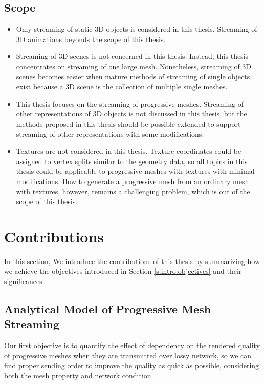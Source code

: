 \documentclass[11pt, a4paper]{report}
\begin{document}
    \subsection{Scope}
    \begin{itemize}
        \item
            Only streaming of static 3D objects is considered in this thesis. 
            Streaming of 3D animations beyonds the scope of this thesis. 
        \item
            Streaming of 3D scenes is not concerned in this thesis.
            Instead, this thesis concentrates on streaming of one large mesh.
            Nonetheless, streaming of 3D scenes becomes easier when mature methods
            of streaming of single objects exist because a 3D scene is the collection
            of multiple single meshes.
        \item
            This thesis focuses on the streaming of progressive meshes. 
            Streaming of other representations of 3D objects is not discussed in this thesis,
            but the methods proposed in this thesis should be possible
            extended to support streaming of other representations with some modifications.
        \item
            Textures are not considered in this thesis. Texture coordinates could be assigned
            to vertex splits similar to the geometry data, so all topics in this thesis could
            be applicable to progressive meshes with textures with minimal modifications. How
            to generate a progressive mesh from an ordinary mesh with textures, however, remains
            a challenging problem, which is out of the scope of this thesis.
    \end{itemize}
  \section{Contributions}
  \label{s:intro:contributions}
    In this section, We introduce the contributions of this thesis by
    summarizing how we achieve the objectives introduced in 
    Section \ref{s:intro:objectives} and their significances.
    
    \subsection{Analytical Model of Progressive Mesh Streaming}
    Our first objective is to quantify the effect of dependency
    on the rendered quality of progressive meshes when they are
    transmitted over lossy network, so we can find proper sending
    order to improve the quality as quick as possible,
    considering both the mesh property and network condition. 
            
\end{document}
